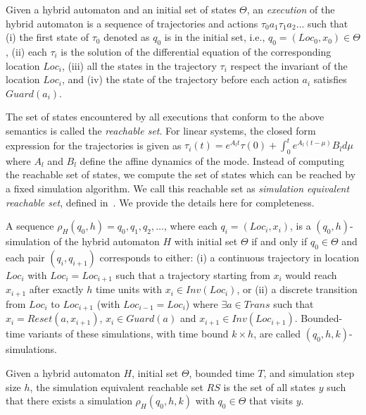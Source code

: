 \begin{definition}
\label{def:hybridExecution}
Given a hybrid automaton and an initial set of states $\Theta$, an \emph{execution} of the hybrid automaton is a sequence of trajectories and actions $\tau_0 a_1 \tau_1 a_2 \ldots $ such that
%
(i) the first state of $\tau_0$ denoted as $q_0$ is in the initial set, i.e., $q_0 = (Loc_0, x_0)\in \Theta$,
%
(ii) each $\tau_i$ is the solution of the differential equation of the corresponding location $Loc_i$, 
%
(iii) all the states in the trajectory $\tau_i$ respect the invariant of the location $Loc_i$,
%
and (iv) the state of the trajectory before each action $a_i$ satisfies $Guard(a_i)$.
\end{definition}
%
The set of states encountered by all executions that conform to the above semantics is called the \emph{reachable set}.
For linear systems, the closed form expression for the trajectories is given as $\tau_i(t) = e^{A_l t}\tau(0) + \int_{0}^{t}e^{A_l (t-\mu)}B_l d\mu$
where $A_l$ and $B_l$ define the affine dynamics of the mode.
%
Instead of computing the reachable set of states, we compute the set of states which can be reached by a fixed simulation algorithm.
%
We call this reachable set as \emph{simulation equivalent reachable set}, defined in~\cite{bak2017tacas}. We provide the details here for completeness.

\begin{definition}
\label{def:stepSim}
A sequence $\rho_{H}(q_0,h) = q_0, q_1, q_2, \ldots$, where each $q_i = (Loc_i, x_i)$, is a $(q_0, h)$-simulation of the hybrid automaton $H$ with initial set $\Theta$ if and only if $q_0 \in \Theta$ and each pair $(q_i, q_{i+1})$ corresponds to either: 
%
(i) a continuous trajectory in location $Loc_i$ with $Loc_i=Loc_{i+1}$ such that a trajectory starting from $x_i$ would reach $x_{i+1}$ after exactly $h$ time units with $x_i \in Inv(Loc_i)$, or 
%
(ii) a discrete transition from $Loc_i$ to $Loc_{i+1}$ (with $Loc_{i-1} = Loc_i$) where  $\exists a \in Trans$ such that $x_i = Reset(a, x_{i+1})$, $x_i \in Guard(a)$ and $x_{i+1} \in
Inv(Loc_{i+1})$.
%
Bounded-time variants of these simulations, with time bound $k\times h$, are called $(q_0, h, k)$-simulations.
\end{definition}

\begin{definition}
\label{def:simRS}
Given a hybrid automaton $H$, initial set $\Theta$, bounded time $T$, and simulation step size $h$, the simulation equivalent reachable set $RS$ is the set of all states $y$ such that there exists a simulation $\rho_{H}(q_0, h, k)$ with $q_0 \in \Theta$ that visits $y$.
\end{definition}


